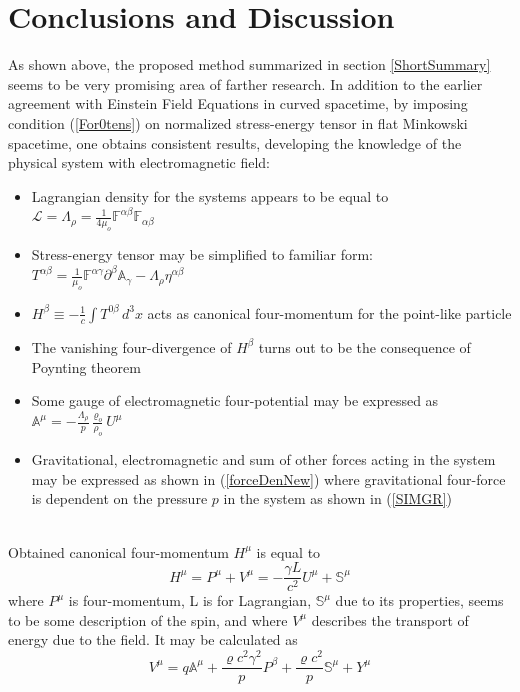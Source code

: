 \documentclass[aps,prx,preprint,groupedaddress,showkeys]{revtex4-2}
\begin{document}
\section{Conclusions and Discussion} \label{3Chap}

As shown above, the proposed method summarized in section \ref{ShortSummary} seems to be very promising area of farther research. In addition to the earlier agreement with Einstein Field Equations in curved spacetime, by imposing condition (\ref{For0tens}) on normalized stress-energy tensor in flat Minkowski spacetime, one obtains consistent results, developing the knowledge of the physical system with electromagnetic field:
\begin{itemize}
  \item Lagrangian density for the systems appears to be equal to $\mathcal{L} = \Lambda_{\rho} = \frac{1}{4\mu_o} \mathbb{F}^{\alpha \beta} \mathbb{F}_{\alpha \beta} $
  \item Stress-energy tensor may be simplified to familiar form: $T^{\alpha \beta} = \frac{1}{\mu_o}\mathbb{F}^{\alpha \gamma} \partial^{\beta} \mathbb{A}_{\gamma} -  \Lambda_{\rho} \eta^{\alpha \beta}$
  \item $H^{\beta} \equiv - \frac{1}{c} \int T^{0 \beta} \, d^3 x$ acts as canonical four-momentum for the point-like particle
  \item The vanishing four-divergence of $H^{\beta}$ turns out to be the consequence of Poynting theorem
  \item Some gauge of electromagnetic four-potential may be expressed as $\mathbb{A}^{\mu} = - \frac{\Lambda_{\rho}}{p} \frac{\varrho_o}{\rho_o} U^{\mu}$
  \item Gravitational, electromagnetic and sum of other forces acting in the system may be expressed as shown in (\ref{forceDenNew}) where gravitational four-force is dependent on the pressure $p$ in the system as shown in (\ref{SIMGR}) 
\end{itemize}
~\\
Obtained canonical four-momentum $H^{\mu}$ is equal to  
\begin{equation} \label{Q2}
H^{\mu} = P^{\mu} + V^{\mu} = - \frac{\gamma L}{c^2}U^{\mu} + \mathbb{S}^{\mu}
\end{equation}
where $P^{\mu}$ is four-momentum, L is for Lagrangian, $\mathbb{S}^{\mu}$ due to its properties, seems to be some description of the spin, and where $V^{\mu}$ describes the transport of energy due to the field. It may be calculated as
\begin{equation} \label{QV1}
V^{\mu} = q \mathbb{A}^{\mu} + \frac{\varrho c^2 \gamma^2}{p} P^{\beta} + \frac{\varrho c^2}{p} \mathbb{S}^{\mu} + Y^{\mu} 
\end{equation}
\end{document}
